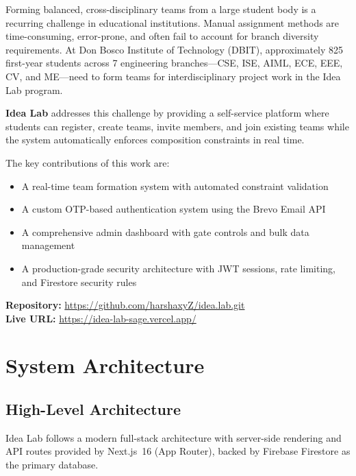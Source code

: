 \documentclass[conference]{IEEEtran}
\begin{document}
Forming balanced, cross-disciplinary teams from a large student body is a recurring challenge in educational institutions. Manual assignment methods are time-consuming, error-prone, and often fail to account for branch diversity requirements. At Don Bosco Institute of Technology (DBIT), approximately 825 first-year students across 7 engineering branches---CSE, ISE, AIML, ECE, EEE, CV, and ME---need to form teams for interdisciplinary project work in the Idea Lab program.

\textbf{Idea Lab} addresses this challenge by providing a self-service platform where students can register, create teams, invite members, and join existing teams while the system automatically enforces composition constraints in real time.

The key contributions of this work are:
\begin{itemize}[noitemsep,topsep=3pt]
    \item A real-time team formation system with automated constraint validation
    \item A custom OTP-based authentication system using the Brevo Email API
    \item A comprehensive admin dashboard with gate controls and bulk data management
    \item A production-grade security architecture with JWT sessions, rate limiting, and Firestore security rules
\end{itemize}

\smallskip
\noindent\textbf{Repository:} \url{https://github.com/harshaxyZ/idea.lab.git}\\
\textbf{Live URL:} \url{https://idea-lab-sage.vercel.app/}

\section{System Architecture}

\subsection{High-Level Architecture}

Idea Lab follows a modern full-stack architecture with server-side rendering and API routes provided by Next.js~16 (App Router), backed by Firebase Firestore as the primary database.
\end{document}
